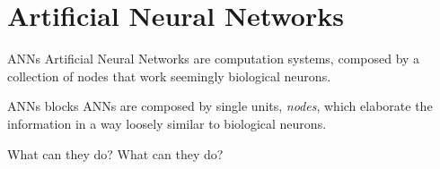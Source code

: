 \documentclass[11pt]{beamer}
\begin{document}
\section{Artificial Neural Networks}
%
\begin{frame}{ANNs}
	Artificial Neural Networks are computation systems, composed by a collection of nodes that work seemingly biological neurons.
\end{frame}
%
\begin{frame}{ANNs blocks}
	ANNs are composed by single units, \textit{nodes}, which elaborate the information in a way loosely similar to biological neurons.
	\begin{figure}
		\centering
		
	\end{figure}
\end{frame}
%
\begin{frame}[c]{What can they do?}
	\center \huge What can they do?
\end{frame}
%
\end{document}
